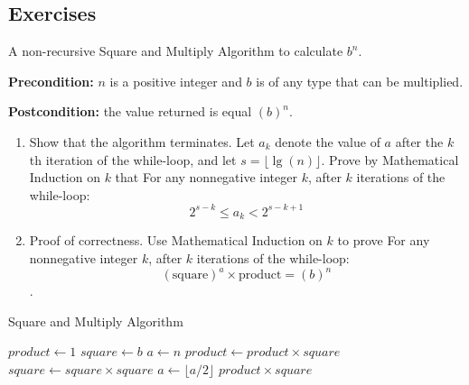 \documentclass[
	12pt, %
	fleqn, %
	a4paper, %
]{LegrandOrangeBook}
\begin{document}
\subsection{Exercises}
\begin{exercise}
    A non-recursive Square and Multiply Algorithm to calculate \( b^n \).

\textbf{Precondition:} \( n \) is a positive integer and \( b \) is of any type that can be multiplied.

\textbf{Postcondition:} the value returned is equal \( (b)^n \).
\begin{enumerate}
    \item Show that the algorithm terminates. Let \( a_k \) denote the value of \( a \) after the \( k \)th iteration of the while-loop, and let \( s = \lfloor \lg(n) \rfloor \). Prove by Mathematical Induction on \( k \) that For any nonnegative integer \( k \), after \( k \) iterations of the while-loop:
    $$2^{s-k} \le a_k < 2^{s-k+1}$$
    \item  Proof of correctness. Use Mathematical Induction on \( k \) to prove For any nonnegative integer \( k \), after \( k \) iterations of the while-loop:
\[ (\text{square})^a \times \text{product} = (b)^n \].
\end{enumerate}
\end{exercise}
\begin{algorithm}
    \caption{Square and Multiply Algorithm}
    \begin{algorithmic}[1]
    \State $product \gets 1$
    \State $square \gets b$
    \State $a \gets n$
         
            \State $product \gets product \times square$
        \EndIf
        \State $square \gets square \times square$
        \State $a \gets \lfloor a / 2 \rfloor$ 
    \EndWhile
    \State \Return $product \times square$
    \end{algorithmic}
\end{algorithm}
\end{document}
